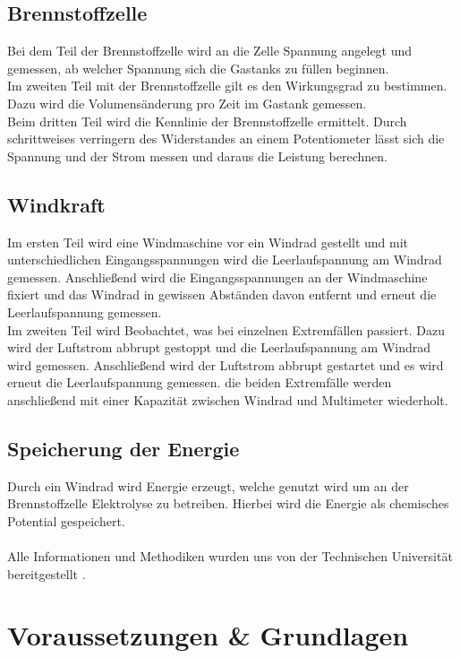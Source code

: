 \documentclass[12pt,a4paper,twoside]{article}
\begin{document}
\subsection{Brennstoffzelle}
Bei dem Teil der Brennstoffzelle wird an die Zelle Spannung angelegt und gemessen, ab welcher Spannung sich die Gastanks zu füllen beginnen. \\
Im zweiten Teil mit der Brennstoffzelle gilt es den Wirkungsgrad zu bestimmen. Dazu wird die Volumensänderung pro Zeit im Gastank gemessen. \\
Beim dritten Teil wird die Kennlinie der Brennstoffzelle ermittelt. Durch schrittweises verringern des Widerstandes an einem Potentiometer lässt sich die Spannung und der Strom messen und daraus die Leistung berechnen. 

\subsection{Windkraft}
Im ersten Teil wird eine Windmaschine vor ein Windrad gestellt und mit unterschiedlichen Eingangsspannungen wird die Leerlaufspannung am Windrad gemessen. 
Anschließend wird die Eingangsspannungen an der Windmaschine fixiert und das Windrad in gewissen Abständen davon entfernt und erneut die Leerlaufspannung gemessen. \\
Im zweiten Teil wird Beobachtet, was bei einzelnen Extremfällen passiert. Dazu wird der Luftstrom abbrupt gestoppt und die Leerlaufspannung am Windrad wird gemessen. 
Anschließend wird der Luftstrom abbrupt gestartet und es wird erneut die Leerlaufspannung gemessen. die beiden Extremfälle werden anschließend mit einer Kapazität zwischen Windrad und Multimeter wiederholt. 

\subsection{Speicherung der Energie}
Durch ein Windrad wird Energie erzeugt, welche genutzt wird um an der Brennstoffzelle Elektrolyse zu betreiben. Hierbei wird die Energie als chemisches Potential gespeichert. 
\\
\\
Alle Informationen und Methodiken wurden uns von der Technischen Universität bereitgestellt \cite{teachcenter2}. 

\section{Voraussetzungen \& Grundlagen} %
\end{document}
